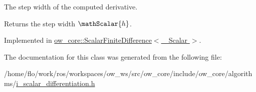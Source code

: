 The step width of the computed derivative. 

\begin{DoxyReturn}{Returns}
the step width $\mathScalar{h}$. 
\end{DoxyReturn}


Implemented in \hyperlink{classow__core_1_1ScalarFiniteDifference_a0bdddc62ac68a69ee7959a2f1b33d1b7}{ow\+\_\+core\+::\+Scalar\+Finite\+Difference$<$ \+\_\+\+Scalar $>$}.



The documentation for this class was generated from the following file\+:\begin{DoxyCompactItemize}
\item 
/home/flo/work/ros/workspaces/ow\+\_\+ws/src/ow\+\_\+core/include/ow\+\_\+core/algorithms/\hyperlink{i__scalar__differentiation_8h}{i\+\_\+scalar\+\_\+differentiation.\+h}\end{DoxyCompactItemize}

